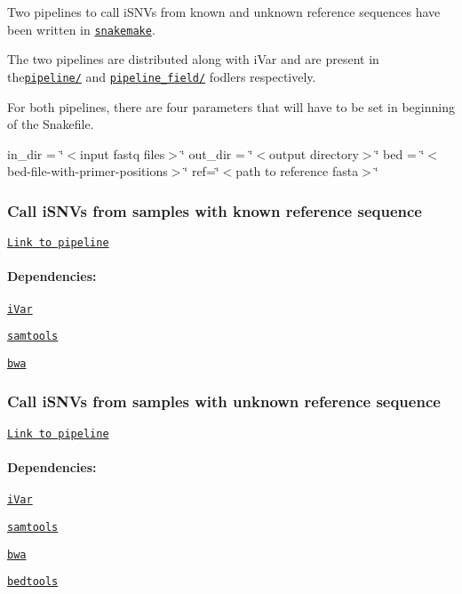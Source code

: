 Two pipelines to call i\+S\+N\+Vs from known and unknown reference sequences have been written in \href{https://snakemake.readthedocs.io/en/stable/}{\tt snakemake}.

The two pipelines are distributed along with i\+Var and are present in the\href{https://github.com/andersen-lab/ivar/tree/master/pipeline}{\tt pipeline/} and \href{https://github.com/andersen-lab/ivar/tree/master/pipeline_field}{\tt pipeline\+\_\+field/} fodlers respectively.

For both pipelines, there are four parameters that will have to be set in beginning of the Snakefile.

in\+\_\+dir = \char`\"{}$<$input fastq files$>$\char`\"{} out\+\_\+dir = \char`\"{}$<$output directory$>$\char`\"{} bed = \char`\"{}$<$bed-\/file-\/with-\/primer-\/positions$>$\char`\"{} ref=\char`\"{}$<$path to reference fasta$>$\char`\"{}

\subsubsection*{Call i\+S\+N\+Vs from samples with known reference sequence}

\href{https://github.com/andersen-lab/ivar/tree/master/pipeline}{\tt Link to pipeline}

\paragraph*{Dependencies\+:}


\begin{DoxyItemize}
\item \href{https://github.com/andersen-lab/ivar}{\tt i\+Var}
\item \href{https://htslib.org/}{\tt samtools}
\item \href{https://github.com/lh3/bwa}{\tt bwa}
\end{DoxyItemize}



\subsubsection*{Call i\+S\+N\+Vs from samples with unknown reference sequence}

\href{https://github.com/andersen-lab/ivar/tree/master/pipeline_field/}{\tt Link to pipeline}

\paragraph*{Dependencies\+:}


\begin{DoxyItemize}
\item \href{https://github.com/andersen-lab/ivar}{\tt i\+Var}
\item \href{https://htslib.org/}{\tt samtools}
\item \href{https://github.com/lh3/bwa}{\tt bwa}
\item \href{https://bedtools.readthedocs.io/en/latest/}{\tt bedtools}
\end{DoxyItemize}

 